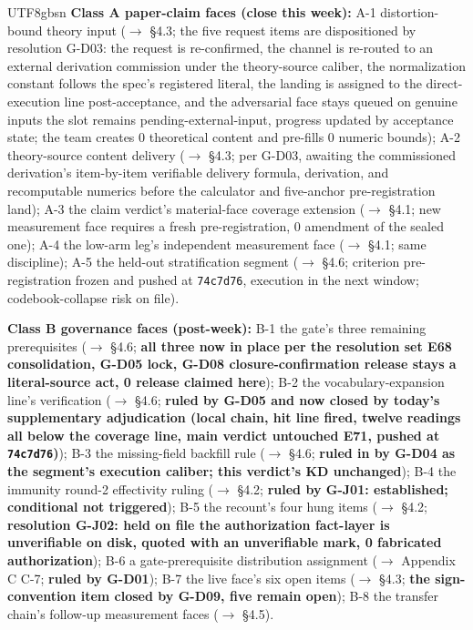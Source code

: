 \documentclass[11pt,letterpaper]{article}
\begin{document}
\begin{CJK}{UTF8}{gbsn}
\textbf{Class A \textemdash{} paper-claim faces (close this week):} A-1 distortion-bound theory input (\ensuremath{\to} \S{}4.3; the five request items are dispositioned by resolution G-D03: the request is re-confirmed, the channel is re-routed to an external derivation commission under the theory-source caliber, the normalization constant follows the spec's registered literal, the landing is assigned to the direct-execution line post-acceptance, and the adversarial face stays queued on genuine inputs \textemdash{} the slot remains pending-external-input, progress updated by acceptance state; the team creates 0 theoretical content and pre-fills 0 numeric bounds); A-2 theory-source content delivery (\ensuremath{\to} \S{}4.3; per G-D03, awaiting the commissioned derivation's item-by-item verifiable delivery \textemdash{} formula, derivation, and recomputable numerics \textemdash{} before the calculator and five-anchor pre-registration land); A-3 the claim verdict's material-face coverage extension (\ensuremath{\to} \S{}4.1; new measurement face requires a fresh pre-registration, 0 amendment of the sealed one); A-4 the low-arm leg's independent measurement face (\ensuremath{\to} \S{}4.1; same discipline); A-5 the held-out stratification segment (\ensuremath{\to} \S{}4.6; criterion pre-registration frozen and pushed at \texttt{74c7d76}, execution in the next window; codebook-collapse risk on file).

\textbf{Class B \textemdash{} governance faces (post-week):} B-1 the gate's three remaining prerequisites (\ensuremath{\to} \S{}4.6; \textbf{all three now in place per the resolution set \textemdash{} E68 consolidation, G-D05 lock, G-D08 closure-confirmation \textemdash{} release stays a literal-source act, 0 release claimed here}); B-2 the vocabulary-expansion line's verification (\ensuremath{\to} \S{}4.6; \textbf{ruled by G-D05 and now closed by today's supplementary adjudication (local chain, hit line fired, twelve readings all below the coverage line, main verdict untouched \textemdash{} E71, pushed at \texttt{74c7d76})}); B-3 the missing-field backfill rule (\ensuremath{\to} \S{}4.6; \textbf{ruled in by G-D04 as the segment's execution caliber; this verdict's KD unchanged}); B-4 the immunity round-2 effectivity ruling (\ensuremath{\to} \S{}4.2; \textbf{ruled by G-J01: established; conditional not triggered}); B-5 the recount's four hung items (\ensuremath{\to} \S{}4.2; \textbf{resolution G-J02: held on file \textemdash{} the authorization fact-layer is unverifiable on disk, quoted with an unverifiable mark, 0 fabricated authorization}); B-6 a gate-prerequisite distribution assignment (\ensuremath{\to} Appendix C C-7; \textbf{ruled by G-D01}); B-7 the live face's six open items (\ensuremath{\to} \S{}4.3; \textbf{the sign-convention item closed by G-D09, five remain open}); B-8 the transfer chain's follow-up measurement faces (\ensuremath{\to} \S{}4.5).


\end{CJK}
\end{document}
